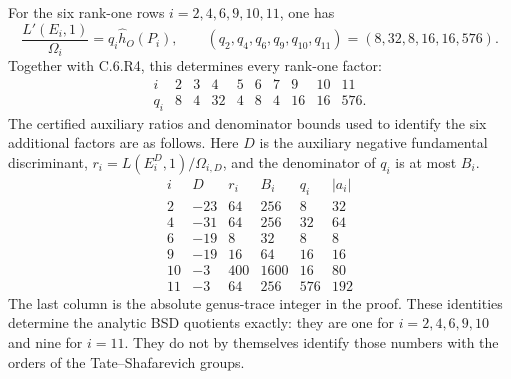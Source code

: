 \begin{statement}
For the six rank-one rows $i=2,4,6,9,10,11$, one has
\[
 \frac{L'(E_i,1)}{\Omega_i}
   =q_i\widehat h_O(P_i),\qquad
 (q_2,q_4,q_6,q_9,q_{10},q_{11})=(8,32,8,16,16,576).
\]
Together with C.6.R4, this determines every rank-one factor:
\[
\begin{array}{c|rrrrrrrrr}
 i&2&3&4&5&6&7&9&10&11\\\hline
 q_i&8&4&32&4&8&4&16&16&576.
\end{array}
\]
The certified auxiliary ratios and denominator bounds used to identify
the six additional factors are as follows. Here $D$ is the auxiliary
negative fundamental discriminant,
$r_i=L(E_i^D,1)/\Omega_{i,D}$, and the denominator of $q_i$ is at most
$B_i$.
\[
\begin{array}{c|r|r|r|r|r}
 i&D&r_i&B_i&q_i&|a_i|\\\hline
 2&-23&64&256&8&32\\
 4&-31&64&256&32&64\\
 6&-19&8&32&8&8\\
 9&-19&16&64&16&16\\
 10&-3&400&1600&16&80\\
 11&-3&64&256&576&192
\end{array}
\]
The last column is the absolute genus-trace integer in the proof. These
identities determine the analytic BSD quotients exactly: they are one
for $i=2,4,6,9,10$ and nine for $i=11$. They do not by themselves
identify those numbers with the orders of the Tate--Shafarevich groups.
\end{statement}

